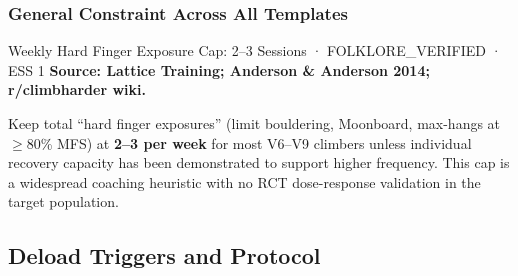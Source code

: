 \subsubsection*{General Constraint Across All Templates}

\begin{folklorebox}{Weekly Hard Finger Exposure Cap: 2--3 Sessions · FOLKLORE\_VERIFIED · ESS 1}
\textbf{Source: Lattice Training; Anderson \& Anderson 2014; r/climbharder wiki.}

Keep total ``hard finger exposures'' (limit bouldering, Moonboard, max-hangs at $\geq$80\% MFS) at \textbf{2–3 per week} for most V6–V9 climbers unless individual recovery capacity has been demonstrated to support higher frequency. This cap is a widespread coaching heuristic with no RCT dose-response validation in the target population.
\end{folklorebox}

\subsection{Deload Triggers and Protocol}
\label{subsec:deload}

